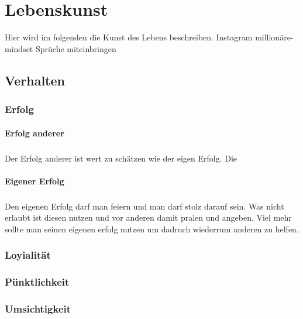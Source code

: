 \chapter{Lebenskunst} 
    \begin{thesis_quotation}

    \end{thesis_quotation}
    
    Hier wird im folgenden die Kunst des Lebens beschreiben. 
    {\color{red}Instagram millionäre-mindset Sprüche miteinbringen }
    
    \section{Verhalten}
        \subsection{Erfolg}
            \subsubsection{Erfolg anderer}
                \paragraph{} Der Erfolg anderer ist wert zu schätzen wie der eigen Erfolg. Die 
            \subsubsection{Eigener Erfolg}
                \paragraph{} Den eigenen Erfolg darf man feiern und man darf stolz darauf sein. Was nicht erlaubt ist diesen nutzen und vor anderen damit pralen und angeben. Viel mehr sollte man seinen eigenen erfolg nutzen um dadruch wiederrum anderen zu helfen.
        \subsection{Loyialität}
        \subsection{Pünktlichkeit}
        \subsection{Umsichtigkeit}
